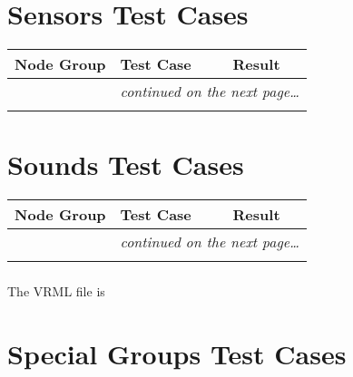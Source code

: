 \documentclass[12pt,letterpaper]{article}
\newcounter{testCaseCtr}
\newcommand{\resetTestCase}{\setcounter{testCaseCtr}{1}}
\begin{document}
\section{Sensors Test Cases}
\resetTestCase

\begin{center}
\setlongtables
\begin{longtable}{|l|l|l|}
\hline
\textbf{Node Group} & \textbf{Test Case} & \textbf{Result} \\
\hline\hline
\endhead
 & \multicolumn{2}{|r|}{\textsl{continued on the next page\ldots}} \\
\hline
\endfoot
\hline
\endlastfoot
& & \\
\cline{2-3}
\end{longtable}
\end{center}

\section{Sounds Test Cases}
\resetTestCase

\begin{center}
\setlongtables
\begin{longtable}{|l|l|l|}
\hline
\textbf{Node Group} & \textbf{Test Case} & \textbf{Result} \\
\hline\hline
\endhead
 & \multicolumn{2}{|r|}{\textsl{continued on the next page\ldots}} \\
\hline
\endfoot
\hline
\endlastfoot
& & \\
\cline{2-3}
\end{longtable}
\end{center}

\subsubsection{}
The VRML file is

\section{Special Groups Test Cases}
\resetTestCase
\end{document}
